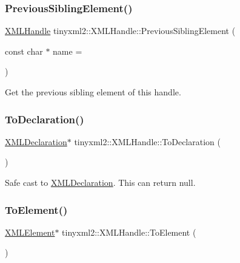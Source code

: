\subsubsection{\texorpdfstring{Previous\+Sibling\+Element()}{PreviousSiblingElement()}}
{\footnotesize\ttfamily \hyperlink{classtinyxml2_1_1_x_m_l_handle}{X\+M\+L\+Handle} tinyxml2\+::\+X\+M\+L\+Handle\+::\+Previous\+Sibling\+Element (\begin{DoxyParamCaption}\item[{const char $\ast$}]{name = {} }\end{DoxyParamCaption})\hspace{0.3cm}{\ttfamily [inline]}}



Get the previous sibling element of this handle. 

\mbox{\label{classtinyxml2_1_1_x_m_l_handle_a108858be7ee3eb53f73b5194c1aa8ff0}} 
\subsubsection{\texorpdfstring{To\+Declaration()}{ToDeclaration()}}
{\footnotesize\ttfamily \hyperlink{classtinyxml2_1_1_x_m_l_declaration}{X\+M\+L\+Declaration}$\ast$ tinyxml2\+::\+X\+M\+L\+Handle\+::\+To\+Declaration (\begin{DoxyParamCaption}{ }\end{DoxyParamCaption})\hspace{0.3cm}{\ttfamily [inline]}}



Safe cast to \hyperlink{classtinyxml2_1_1_x_m_l_declaration}{X\+M\+L\+Declaration}. This can return null. 

\mbox{\label{classtinyxml2_1_1_x_m_l_handle_a5e73ed8f3f6f9619d5a8bb1862c47d99}} 
\subsubsection{\texorpdfstring{To\+Element()}{ToElement()}}
{\footnotesize\ttfamily \hyperlink{classtinyxml2_1_1_x_m_l_element}{X\+M\+L\+Element}$\ast$ tinyxml2\+::\+X\+M\+L\+Handle\+::\+To\+Element (\begin{DoxyParamCaption}{ }\end{DoxyParamCaption})\hspace{0.3cm}{\ttfamily [inline]}}



